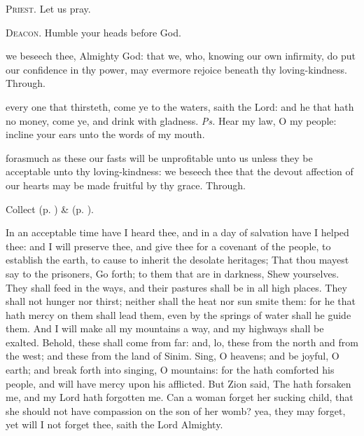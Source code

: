 \textsc{Priest.} Let us pray.\par
\textsc{Deacon.} Humble your heads before God.\par
{} we beseech thee, Almighty God: that we, who, knowing our own infirmity, do put our confidence in thy power, may evermore rejoice beneath thy loving-kindness. Through.



\introit
{} every one that thirsteth, come ye to the waters, saith the Lord: and he that hath no money, come ye, and drink with gladness. \textit{Ps.} Hear my law, O my people: incline your ears unto the words of my mouth.

\collect
{} forasmuch as these our fasts will be unprofitable unto us unless they be acceptable unto thy loving-kindness: we beseech thee that the devout affection of our hearts may be made fruitful by thy grace. Through.
\begin{rubric}
     Collect  (p. \pageref{AshWednesdayMassCollect}) \&   (p. \pageref{SPLivingDeparted}).
\end{rubric}

 In an acceptable time have I heard thee, and in a day of salvation have I helped thee: and I will preserve thee, and give thee for a covenant of the people, to establish the earth, to cause to inherit the desolate heritages; That thou mayest say to the prisoners, Go forth; to them that are in darkness, Shew yourselves. They shall feed in the ways, and their pastures shall be in all high places. They shall not hunger nor thirst; neither shall the heat nor sun smite them: for he that hath mercy on them shall lead them, even by the springs of water shall he guide them. And I will make all my mountains a way, and my highways shall be exalted. Behold, these shall come from far: and, lo, these from the north and from the west; and these from the land of Sinim. Sing, O heavens; and be joyful, O earth; and break forth into singing, O mountains: for the  hath comforted his people, and will have mercy upon his afflicted. But Zion said, The  hath forsaken me, and my Lord hath forgotten me. Can a woman forget her sucking child, that she should not have compassion on the son of her womb? yea, they may forget, yet will I not forget thee, saith the Lord Almighty.


